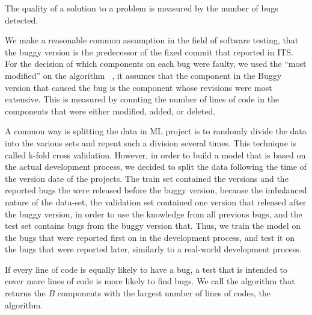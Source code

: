 The quality of a solution to a \btg problem is measured by the number of bugs detected.
%














We make a reasonable common assumption in the field of software testing, that the buggy version is the predecessor of the fixed commit that reported in \ac{ITS}.
%
For the decision of which components on each bug were faulty, we used the ``most modified'' on the \fp algorithm ~\cite{elmishali2019debguer}, it assumes that the component in the Buggy version that caused the bug is the component whose revisions were most extensive. This is measured by counting the number of lines of code in the components that were either modified, added, or deleted. 




A common way is splitting the data in ML project is to randomly divide the data into the various sets and repeat such a division several times. This technique is called k-fold cross validation. However, in order to build a \fp model that is based on the actual development process, we decided to split the data following the time of the version date of the projects. The train set contained the versions and the reported bugs the were released before the buggy version, because the imbalanced nature of the data-set, the validation set contained one version that released after the buggy version, in order to use the knowledge from all previous bugs, and the test set contains bugs from the buggy version that. Thus, we train the model on the bugs that were reported first on in the development process, and test it on the bugs that were reported later, similarly to a real-world development process.




 If every line of code is equally likely to have a bug, a test that is intended to cover more lines of code is more likely to find
    bugs. We call the algorithm that returns the $B$ components with the largest
    number of lines of codes, the \loc \btg algorithm. 
    
